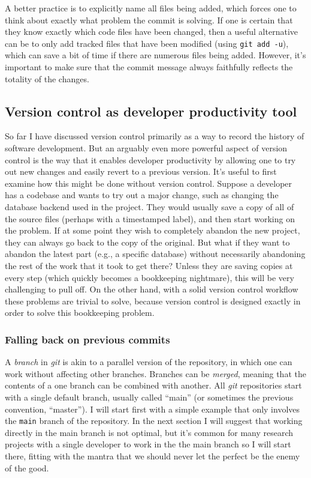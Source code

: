 A better practice is to explicitly name all files being added, which forces one to think about exactly what problem the commit is solving.
If one is certain that they know exactly which code files have been changed, then a useful alternative can be to only add tracked files that have been modified (using \texttt{git add -u}), which can save a bit of time if there are numerous files being added.
However, it's important to make sure that the commit message always faithfully reflects the totality of the changes.

\subsection{Version control as developer productivity tool}

So far I have discussed version control primarily as a way to record the history of software development.
But an arguably even more powerful aspect of version control is the way that it enables developer productivity by allowing one to try out new changes and easily revert to a previous version.
It's useful to first examine how this might be done without version control.
Suppose a developer has a codebase and wants to try out a major change, such as changing the database backend used in the project.
They would usually save a copy of all of the source files (perhaps with a timestamped label), and then start working on the problem.
If at some point they wish to completely abandon the new project, they can always go back to the copy of the original.
But what if they want to abandon the latest part (e.g., a specific database) without necessarily abandoning the rest of the work that it took to get there? Unless they are saving copies at every step (which quickly becomes a bookkeeping nightmare), this will be very challenging to pull off.
On the other hand, with a solid version control workflow these problems are trivial to solve, because version control is designed exactly in order to solve this bookkeeping problem.

\subsubsection{Falling back on previous commits}

A \textit{branch} in \textit{git} is akin to a parallel version of the repository, in which one can work without affecting other branches.
Branches can be \textit{merged}, meaning that the contents of a one branch can be combined with another.
All \textit{git} repositories start with a single default branch, usually called ``main'' (or sometimes the previous convention, ``master'').  
I will start first with a simple example that only involves the \texttt{main} branch of the repository.
In the next section I will suggest that working directly in the main branch is not optimal, but it's common for many research projects with a single developer to work in the the main branch so I will start there, fitting with the mantra that we should never let the perfect be the enemy of the good.

